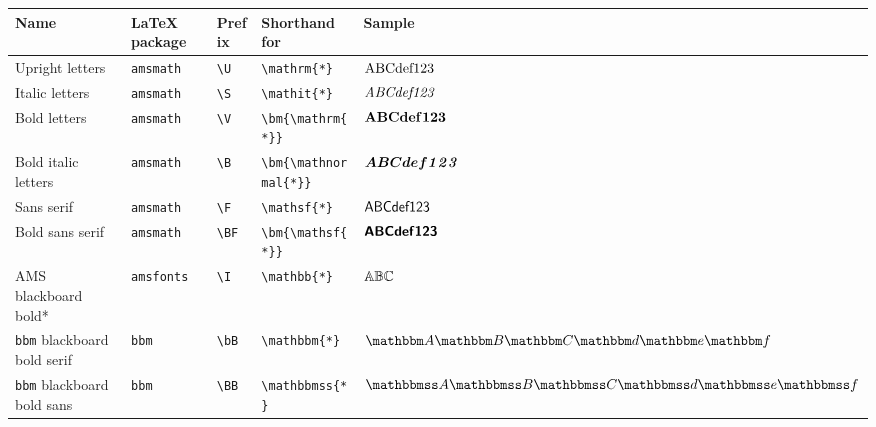 \documentclass[]{article}
\begin{document}
\begin{table}[htbp]
  \hspace{-1.8cm}
  \begin{tabular}{p{14em} l l l l}
    \toprule
    Name & \LaTeX{} package & Prefix & Shorthand for & Sample \\
    \midrule
    Upright letters & \texttt{amsmath} & \verb+\U+ & \verb+\mathrm{*}+ & $\mathrm{A}\mathrm{B}\mathrm{C}\mathrm{d}\mathrm{e}\mathrm{f}\mathrm{1}\mathrm{2}\mathrm{3}$\\
    Italic letters & \texttt{amsmath} & \verb+\S+ & \verb+\mathit{*}+ & $\mathit{A}\mathit{B}\mathit{C}\mathit{d}\mathit{e}\mathit{f}\mathit{1}\mathit{2}\mathit{3}$ \\
    Bold letters & \texttt{amsmath} & \verb+\V+ & \verb+\bm{\mathrm{*}}+ & ${\bm{\mathrm{A}}}{\bm{\mathrm{B}}}{\bm{\mathrm{C}}}{\bm{\mathrm{d}}}{\bm{\mathrm{e}}}{\bm{\mathrm{f}}}{\bm{\mathrm{1}}}{\bm{\mathrm{2}}}{\bm{\mathrm{3}}}$ \\
    Bold italic letters & \texttt{amsmath} & \verb+\B+ & \verb+\bm{\mathnormal{*}}+ & ${\bm{\mathnormal{A}}}{\bm{\mathnormal{B}}}{\bm{\mathnormal{C}}}{\bm{\mathnormal{d}}}{\bm{\mathnormal{e}}}{\bm{\mathnormal{f}}}{\bm{\mathit{1}}}{\bm{\mathit{2}}}{\bm{\mathit{3}}}$ \\
    Sans serif & \texttt{amsmath} & \verb+\F+ & \verb+\mathsf{*}+ & $\mathsf{A}\mathsf{B}\mathsf{C}\mathsf{d}\mathsf{e}\mathsf{f}\mathsf{1}\mathsf{2}\mathsf{3}$\\
    Bold sans serif & \texttt{amsmath} & \verb+\BF+ & \verb+\bm{\mathsf{*}}+ & ${\bm{\mathsf{A}}}{\bm{\mathsf{B}}}{\bm{\mathsf{C}}}{\bm{\mathsf{d}}}{\bm{\mathsf{e}}}{\bm{\mathsf{f}}}{\bm{\mathsf{1}}}{\bm{\mathsf{2}}}{\bm{\mathsf{3}}}$\\
    AMS blackboard bold* & \texttt{amsfonts} & \verb+\I+ & \verb+\mathbb{*}+ &
                                                                               $\mathbb{A}\mathbb{B}\mathbb{C}$ \\ %
    \texttt{bbm} blackboard bold serif & \texttt{bbm} & \verb+\bB+ & \verb+\mathbbm{*}+ & $\bBA\bBB\bBC\bBd\bBe\bBf$\\
    \texttt{bbm} blackboard bold sans & \texttt{bbm} & \verb+\BB+ & \verb+\mathbbmss{*}+ & $\BBA\BBB\BBC\BBd\BBe\BBf$ \\

\end{tabular}
\end{table}
\end{document}
